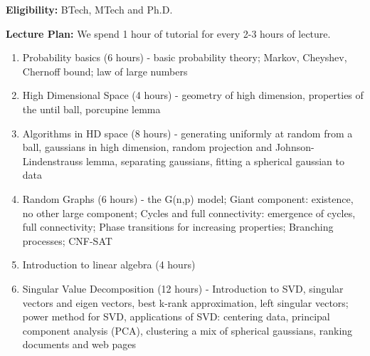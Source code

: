 \documentclass[12pt, a4paper]{letter} %
\begin{document}
\textbf{Eligibility:} BTech, MTech and Ph.D.



\noindent
\textbf{Lecture Plan:}
We spend 1 hour of tutorial for every 2-3 hours of lecture.
\begin{enumerate}
\item Probability basics (6 hours) - basic probability theory; Markov, Cheyshev, Chernoff bound; law of large numbers
\item High Dimensional Space (4 hours) - geometry of high dimension, properties of the until ball, porcupine lemma
\item Algorithms in HD space (8 hours) - generating uniformly at random from a ball, gaussians in high dimension, random projection and Johnson-Lindenstrauss lemma, separating gaussians, fitting a spherical gaussian to data
\item Random Graphs (6 hours) - the G(n,p) model; Giant component: existence, no other large component; Cycles and full connectivity: emergence of cycles, full connectivity;
	Phase transitions for increasing properties; Branching processes; CNF-SAT
\item Introduction to linear algebra (4 hours)
\item Singular Value Decomposition (12 hours) - Introduction to SVD, singular vectors and eigen vectors, best k-rank approximation, left singular vectors; power method for SVD, applications of SVD: centering data, principal component analysis (PCA), clustering a mix of spherical gaussians, ranking documents and web pages
\end{enumerate}
\end{document}
